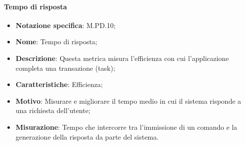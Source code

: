 \paragraph*{Tempo di risposta}
\begin{itemize}
    \item \textbf{Notazione specifica}: M.PD.10;
    \item \textbf{Nome}: Tempo di risposta;
    \item \textbf{Descrizione}: Questa metrica misura l'efficienza con cui l'applicazione completa una transazione (task);
    \item \textbf{Caratteristiche}: Efficienza;
    \item \textbf{Motivo}: Misurare e migliorare il tempo medio in cui il sistema risponde a una richiesta dell'utente;
    \item \textbf{Misurazione}: Tempo che intercorre tra l’immissione di un comando e la generazione della risposta da parte del sistema.
\end{itemize}
